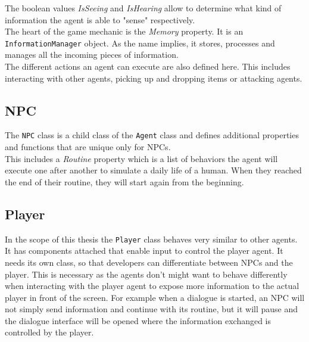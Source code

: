 The boolean values \textit{IsSeeing} and \textit{IsHearing} allow to determine what kind of information the agent is able to "sense" respectively.\\
The heart of the game mechanic is the \textit{Memory} property. It is an \verb|InformationManager| object. As the name implies, it stores, processes and manages all the incoming pieces of information.\\
The different actions an agent can execute are also defined here. This includes interacting with other agents, picking up and dropping items or attacking agents.
\subsection{NPC}
The \verb|NPC| class is a child class of the \verb|Agent| class and defines additional properties and functions that are unique only for NPCs.\\
This includes a \textit{Routine} property which is a list of behaviors the agent will execute one after another to simulate a daily life of a human. When they reached the end of their routine, they will start again from the beginning.
\subsection{Player}
In the scope of this thesis the \verb|Player| class behaves very similar to other agents. It has components attached that enable input to control the player agent. It needs its own class, so that developers can differentiate between NPCs and the player. This is necessary as the agents don't might want to behave differently when interacting with the player agent to expose more information to the actual player in front of the screen. For example when a dialogue is started, an NPC will not simply send information and continue with its routine, but it will pause and the dialogue interface will be opened where the information exchanged is controlled by the player.
